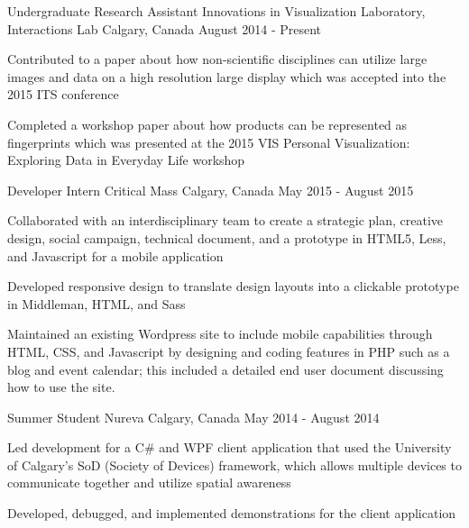 \begin{cventries}
  \cventry
    {Undergraduate Research Assistant}
    {Innovations in Visualization Laboratory, Interactions Lab}
    {Calgary, Canada}
    {August 2014 - Present}
    {
      \begin{cvitems}
        \item {Contributed to a paper about how non-scientific disciplines can utilize large images and data on a high resolution large display which was accepted into the 2015 ITS conference}
        \item {Completed a workshop paper about how products can be represented as fingerprints which was presented at the 2015 VIS Personal Visualization: Exploring Data in Everyday Life workshop}
      \end{cvitems}
    }
  \cventry
    {Developer Intern}
    {Critical Mass}
    {Calgary, Canada}
    {May 2015 - August 2015}
    {
      \begin{cvitems}
        \item {Collaborated with an interdisciplinary team to create a strategic plan, creative design, social campaign, technical document, and a prototype in HTML5, Less, and Javascript for a mobile application}
        \item {Developed responsive design to translate design layouts into a clickable prototype in Middleman, HTML, and Sass}
        \item {Maintained an existing Wordpress site to include mobile capabilities through HTML, CSS, and Javascript by designing and coding features in PHP such as a blog and event calendar; this included a detailed end user document discussing how to use the site.}
      \end{cvitems}
    }
  \cventry
    {Summer Student}
    {Nureva}
    {Calgary, Canada}
    {May 2014 - August 2014}
    {
      \begin{cvitems}
        \item {Led development for a C\# and WPF client application that used the University of Calgary's SoD (Society of Devices) framework, which allows multiple devices to communicate together and utilize spatial awareness}
        \item {Developed, debugged, and implemented demonstrations for the client application}
      \end{cvitems}  
}
\end{cventries}
